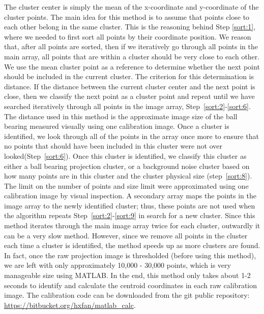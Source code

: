 The cluster center is simply the mean of the x-coordinate and y-coordinate of the cluster points.  The main idea for this method is to assume that points close to each other belong in the same cluster.  This is the reasoning behind Step \ref{sort:1}, where we needed to first sort all points by their coordinate position.  We reason that, after all points are sorted, then if we iteratively go through all points in the main array, all points that are within a cluster should be very close to each other.  We use the mean cluster point as a reference to determine whether the next point should be included in the current cluster.  The criterion for this determination is distance.  If the distance between the current cluster center and the next point is close, then we classify the next point as a cluster point and repeat until we have searched iteratively through all points in the image array, Step~\ref{sort:2}-\ref{sort:6}.  The distance used in this method is the approximate image size of the ball bearing measured visually using one calibration image.  Once a cluster is identified, we look through all of the points in the array once more to ensure that no points that should have been included in this cluster were not over looked(Step~\ref{sort:6}).  Once this cluster is identified, we classify this cluster as either a ball bearing projection cluster, or a background noise cluster based on how many points are in this cluster and the cluster physical size (step~\ref{sort:8}).  The limit on the number of points and size limit were approximated using one calibration image by visual inspection.  A secondary array maps the points in the image array to the newly identified cluster; thus, these points are not used when the algorithm repeats Step~\ref{sort:2}-\ref{sort:9} in search for a new cluster.  Since this method iterates through the main image array twice for each cluster, outwardly it can be a very slow method.  However, since we remove all points in the cluster each time a cluster is identified, the method speeds up as more clusters are found.  In fact, once the raw projection image is thresholded (before using this method), we are left with only approximately 10,000 - 30,000 points, which is very manageable size using MATLAB.  In the end, this method only takes about 1-2 seconds to identify and calculate the centroid coordinates in each raw calibration image.  The calibration code can be downloaded from the git public repository: \hyperref[]{\url{https://bitbucket.org/hxfan/matlab_calc}}.

